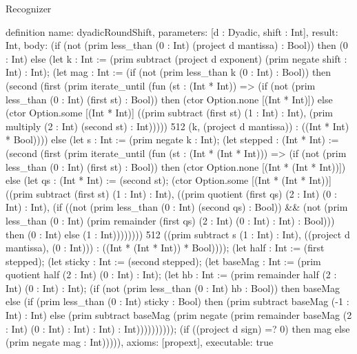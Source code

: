 \begin{lexlean}{Recognizer}
\begin{semanticmodule}
definition{
  name: dyadicRoundShift,
  parameters: [d : Dyadic, shift : Int],
  result: Int,
  body: (if (not (prim less_than (0 : Int) (project d mantissa) : Bool)) then (0 : Int) else (let k : Int := (prim subtract (project d exponent) (prim negate shift : Int) : Int); (let mag : Int := (if (not (prim less_than k (0 : Int) : Bool)) then (second (first (prim iterate_until (fun (st : (Int * Int)) => (if (not (prim less_than (0 : Int) (first st) : Bool)) then (ctor Option.none [(Int * Int)]) else (ctor Option.some [(Int * Int)] ((prim subtract (first st) (1 : Int) : Int), (prim multiply (2 : Int) (second st) : Int))))) 512 (k, (project d mantissa)) : ((Int * Int) * Bool)))) else (let s : Int := (prim negate k : Int); (let stepped : (Int * Int) := (second (first (prim iterate_until (fun (st : (Int * (Int * Int))) => (if (not (prim less_than (0 : Int) (first st) : Bool)) then (ctor Option.none [(Int * (Int * Int))]) else (let qs : (Int * Int) := (second st); (ctor Option.some [(Int * (Int * Int))] ((prim subtract (first st) (1 : Int) : Int), ((prim quotient (first qs) (2 : Int) (0 : Int) : Int), (if ((not (prim less_than (0 : Int) (second qs) : Bool)) && (not (prim less_than (0 : Int) (prim remainder (first qs) (2 : Int) (0 : Int) : Int) : Bool))) then (0 : Int) else (1 : Int)))))))) 512 ((prim subtract s (1 : Int) : Int), ((project d mantissa), (0 : Int))) : ((Int * (Int * Int)) * Bool)))); (let half : Int := (first stepped); (let sticky : Int := (second stepped); (let baseMag : Int := (prim quotient half (2 : Int) (0 : Int) : Int); (let hb : Int := (prim remainder half (2 : Int) (0 : Int) : Int); (if (not (prim less_than (0 : Int) hb : Bool)) then baseMag else (if (prim less_than (0 : Int) sticky : Bool) then (prim subtract baseMag (-1 : Int) : Int) else (prim subtract baseMag (prim negate (prim remainder baseMag (2 : Int) (0 : Int) : Int) : Int) : Int)))))))))); (if ((project d sign) =? 0) then mag else (prim negate mag : Int))))),
  axioms: [propext],
  executable: true
}


\end{semanticmodule}
\end{lexlean}
